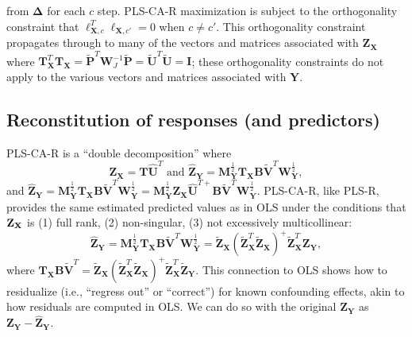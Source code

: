 \documentclass[12pt]{article}
\begin{document}
from \({\mathbf \Delta}\) for each \(c\) step. PLS-CA-R maximization is
subject to the orthogonality constraint that
\({\boldsymbol \ell}_{{\mathbf X},c}^{T}{\boldsymbol \ell}_{{\mathbf X},c'} = 0\)
when \(c \neq c'\). This orthogonality constraint propagates through to
many of the vectors and matrices associated with
\({\mathbf Z}_{\mathbf X}\) where
\({\mathbf T}_{\mathbf X}^{T}{\mathbf T}_{\mathbf X} = \widetilde{\mathbf P}^{T}{\mathbf W}_{J}^{-1}\widetilde{\mathbf P} = \widetilde{\mathbf U}^{T}\widetilde{\mathbf U} = {\mathbf I}\);
these orthogonality constraints do not apply to the various vectors and
matrices associated with \({\mathbf Y}\).

\hypertarget{reconstitution-of-responses-and-predictors}{%
\subsection{Reconstitution of responses (and
predictors)}\label{reconstitution-of-responses-and-predictors}}

\label{section:recresp}

PLS-CA-R is a ``double decomposition'' where \begin{equation}
{\mathbf Z}_{\mathbf X} = {\mathbf T}\widehat{\mathbf U}^{T} \text{ and } \widehat{{\mathbf Z}}_{\mathbf Y} = {\mathbf M}^{\frac{1}{2}}_{\mathbf Y}{\mathbf T}_{\mathbf X}{\mathbf B}\widetilde{\mathbf V}^{T}{\mathbf W}^{\frac{1}{2}}_{\mathbf Y},
\label{eq:doubledecomp}
\end{equation} and
\(\widehat{{\mathbf Z}}_{\mathbf Y} = {\mathbf M}^{\frac{1}{2}}_{\mathbf Y}{\mathbf T}_{\mathbf X}{\mathbf B}\widetilde{\mathbf V}^{T}{\mathbf W}^{\frac{1}{2}}_{\mathbf Y} = {\mathbf M}^{\frac{1}{2}}_{\mathbf Y}{\mathbf Z}_{\mathbf X}\widehat{\mathbf U}^{{T}{+}}{\mathbf B}\widetilde{\mathbf V}^{T}{\mathbf W}^{\frac{1}{2}}_{\mathbf Y}\).
PLS-CA-R, like PLS-R, provides the same estimated predicted values as in
OLS under the conditions that \({\bf Z}_{\bf X}\) is (1) full rank, (2)
non-singular, (3) not excessively multicollinear: \begin{equation}
\widehat{{\mathbf Z}}_{\mathbf Y} = {\mathbf M}^{\frac{1}{2}}_{\mathbf Y}{\mathbf T}_{\mathbf X}{\mathbf B}\widetilde{\mathbf V}^{T}{\mathbf W}^{\frac{1}{2}}_{\mathbf Y} = \widetilde{\mathbf Z}_{\mathbf X} (\widetilde{\mathbf Z}_{\mathbf X}^{T}\widetilde{\mathbf Z}_{\mathbf X})^{+} \widetilde{\mathbf Z}_{\mathbf X}^T {\mathbf Z}_{\mathbf Y},
\label{ols_equivalence}
\end{equation} where
\({\mathbf T}_{\mathbf X}{\mathbf B}\widetilde{\mathbf V}^{T} = \widetilde{\mathbf Z}_{\mathbf X} (\widetilde{\mathbf Z}_{\mathbf X}^{T}\widetilde{\mathbf Z}_{\mathbf X})^{+} \widetilde{\mathbf Z}_{\mathbf X}^T\widetilde{\mathbf Z}_{\mathbf Y}\).
This connection to OLS shows how to residualize (i.e., ``regress out''
or ``correct'') for known confounding effects, akin to how residuals are
computed in OLS. We can do so with the original
\({\mathbf Z}_{\mathbf Y}\) as
\({\mathbf Z}_{\mathbf Y} - \widehat{\mathbf Z}_{\mathbf Y}\).
\end{document}
